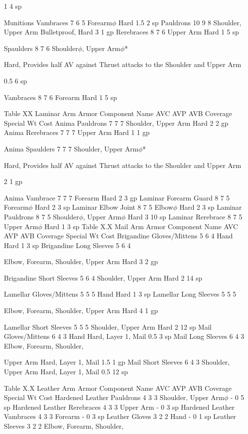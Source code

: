 \documentclass[oneside,11pt,english]{book}
\begin{document}
1 4 sp

Munitions 
Vambraces 7 6 5 Forearm$\phi$ Hard 1.5 2 sp
Pauldrons 10 9 8 Shoulder, Upper Arm Bulletproof, Hard 3 1 gp
Rerebraces 8 7 6 Upper Arm Hard 1 5 sp

Spaulders 8 7 6 Shoulder$\phi$, Upper Arm$\phi$*

Hard, Provides half AV against
Thrust attacks to the Shoulder 
and Upper Arm

0.5 6 sp

Vambraces 8 7 6 Forearm Hard 1 5 sp

Table XX Laminar Arm Armor
Component Name AVC AVP AVB Coverage Special Wt Cost
Anima Pauldrons 7 7 7 Shoulder, Upper Arm Hard 2 2 gp
Anima Rerebraces 7 7 7 Upper Arm Hard 1 1 gp

Anima Spaulders 7 7 7 Shoulder, Upper Arm$\phi$*

Hard, Provides half AV against 
Thrust attacks to the Shoulder 
and Upper Arm

2 1 gp

Anima Vambrace 7 7 7 Forearm Hard 2 3 gp
Laminar Forearm 
Guard 8 7 5 Forearm$\phi$ Hard 2 3 sp
Laminar Elbow 
Joint 8 7 5 Elbow$\phi$ Hard 2 3 sp
Laminar Pauldrons 8 7 5 Shoulder$\phi$, Upper Arm$\phi$ Hard 3 10 sp
Laminar Rerebrace 8 7 5 Upper Arm$\phi$ Hard 1 3 sp
Table X.X Mail Arm Armor
Component Name AVC AVP AVB Coverage Special Wt Cost
Brigandine 
Gloves/Mittens 5 6 4 Hand Hard 1 3 sp
Brigandine Long 
Sleeves 5 6 4

Elbow, Forearm, Shoulder,
Upper Arm Hard 3 2 gp

Brigandine Short 
Sleeves 5 6 4 Shoulder, Upper Arm Hard 2 14 sp


Lamellar 
Gloves/Mittens 5 5 5 Hand Hard 1 3 sp
Lamellar Long 
Sleeves 5 5 5

Elbow, Forearm, Shoulder,
Upper Arm Hard 4 1 gp

Lamellar Short 
Sleeves 5 5 5 Shoulder, Upper Arm Hard 2 12 sp
Mail 
Gloves/Mittens 6 4 3 Hand Hard, Layer 1, Mail 0.5 3 sp
Mail Long Sleeves 6 4 3 Elbow, Forearm, Shoulder,

Upper Arm Hard, Layer 1, Mail 1.5 1 gp
Mail Short Sleeves 6 4 3 Shoulder, Upper Arm Hard, Layer 1, Mail 0.5 12 sp

Table X.X Leather Arm Armor
Component Name AVC AVP AVB Coverage Special Wt Cost
Hardened Leather 
Pauldrons 4 3 3 Shoulder, Upper Arm$\phi$ - 0 5 sp
Hardened Leather 
Rerebraces 4 3 3 Upper Arm - 0 3 sp
Hardened Leather 
Vambraces 4 3 3 Forearm - 0 3 sp
Leather Gloves 3 2 2 Hand - 0 1 sp
Leather Sleeves 3 2 2 Elbow, Forearm, Shoulder,
\end{document}
